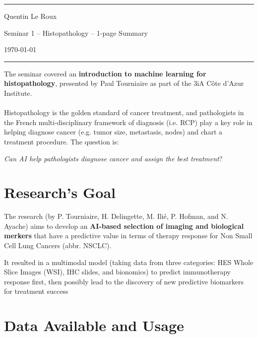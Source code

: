 \documentclass[a4paper]{article}
\begin{document}

\fancyhead[C]{}
\hrule \medskip %
\begin{minipage}{0.24\textwidth} 
\raggedright
\footnotesize
Quentin Le Roux \hfill
\end{minipage}
\begin{minipage}{0.5\textwidth} 
\centering 
Seminar 1 -- Histopathology -- 1-page Summary
\end{minipage}
\begin{minipage}{0.245\textwidth} 
\raggedleft
\today
\end{minipage}
\hrule 
\bigskip


The seminar covered an \textbf{introduction to machine learning for histopathology}, presented by Paul Tourniaire as part of the 3iA Côte d'Azur Institute. 
\\\\
Histopathology is the golden standard of cancer treatment, and pathologists in the French multi-disciplinary framework of diagnosis (i.e. RCP) play a key role in helping diagnose cancer (e.g. tumor size, metastasis, nodes) and chart a treatment procedure. The question is: 

\begin{center}
\textit{Can AI help pathologists diagnose cancer and assign the best treatment}?
\end{center}

\section{Research's Goal}
The research (by P. Tourniaire, H. Delingette, M. Ilié, P. Hofman, and N. Ayache) aims to develop an \textbf{AI-based selection of imaging and biological merkers} that have a predictive value in terms of therapy response for Non Small Cell Lung Cancers (abbr. NSCLC). 

It resulted in a multimodal model (taking data from three categories: HES Whole Slice Images (WSI), IHC slides, and bionomics) to predict immunotherapy response first, then possibly lead to the discovery of new predictive biomarkers for treatment success

\section{Data Available and Usage}
\end{document}
